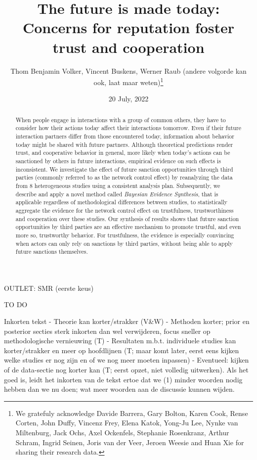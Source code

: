 \documentclass[
  11pt,
]{article}
\title{The future is made today: Concerns for reputation foster trust and cooperation}
\author{Thom Benjamin Volker, Vincent Buskens, Werner Raub (andere volgorde kan ook, laat maar weten)\footnote{We gratefuly acknowledge Davide Barrera, Gary Bolton, Karen Cook, Rense Corten, John Duffy, Vincenz Frey, Elena Katok, Yong-Ju Lee, Nynke van Miltenburg, Jack Ochs, Axel Ockenfels, Stephanie Rosenkranz, Arthur Schram, Ingrid Seinen, Joris van der Veer, Jeroen Weesie and Huan Xie for sharing their research data.}}
\date{20 July, 2022}
\begin{document}
\maketitle

\begin{abstract}
When people engage in interactions with a group of common others, they have to consider how their actions today affect their interactions tomorrow.
Even if their future interaction partners differ from those encountered today, information about behavior today might be shared with future partners. 
Although theoretical predictions render trust, and cooperative behavior in general, more likely when today's actions can be sanctioned by others in future interactions, empirical evidence on such effects is inconsistent. 
We investigate the effect of future sanction opportunities through third parties (commonly referred to as the network control effect) by reanalyzing the data from 8 heterogeneous studies using a consistent analysis plan.
Subsequently, we describe and apply a novel method called \textit{Bayesian Evidence Synthesis}, that is applicable regardless of methodological differences between studies, to statistically aggregate the evidence for the network control effect on trustfulness, trustworthiness and cooperation over these studies. 
Our synthesis of results shows that future sanction opportunities by third parties are an effective mechanism to promote trustful, and even more so, trustworthy behavior.
For trustfulness, the evidence is especially convincing when actors can only rely on sanctions by third parties, without being able to apply future sanctions themselves. 
\end{abstract}

\def\fillandplacepagenumber{%
 \par\pagestyle{empty}%
 \vbox to 0pt{\vss}\vfill
 \vbox to 0pt{\baselineskip0pt
   \hbox to\linewidth{\hss}%
   \baselineskip\footskip
   \hbox to\linewidth{%
     \hfil\thepage\hfil}\vss}}

\newpage

OUTLET: SMR (eerste keus)

TO DO

Inkorten tekst
- Theorie kan korter/strakker (V\&W)
- Methoden korter; prior en posterior secties sterk inkorten dan wel verwijderen, focus sneller op methodologische vernieuwing (T)
- Resultaten m.b.t. individuele studies kan korter/strakker en meer op hoofdlijnen (T; maar komt later, eerst eens kijken welke studies er nog zijn en of we nog meer moeten inpassen)
- Eventueel: kijken of de data-sectie nog korter kan (T; eerst opzet, niet volledig uitwerken).
Als het goed is, leidt het inkorten van de tekst ertoe dat we (1) minder woorden nodig hebben dan we nu doen; wat meer woorden aan de discussie kunnen wijden.
\end{document}
